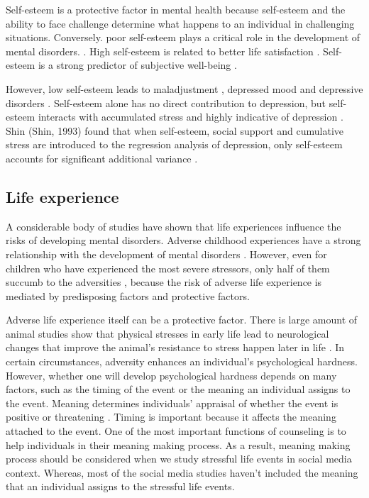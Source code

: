 Self-esteem is a protective factor in mental health because self-esteem and the ability to face challenge determine what happens to an individual in challenging situations. Conversely. poor self-esteem plays a critical role in the development of mental disorders. \cite{mann2004self}. High self-esteem is related to better life satisfaction \cite{zimmerman2000self}.  Self-esteem is a strong predictor of subjective well-being \cite{furnham2000perceived}. 

However, low self-esteem leads to maladjustment \cite{garmezy1984study}, depressed mood and depressive disorders \cite{rice1998self,dori1999depression}. Self-esteem alone has no direct contribution to depression, but self-esteem interacts with accumulated stress and highly indicative of depression \cite{miller1989self}.  Shin (Shin, 1993) found that when self-esteem, social support and cumulative stress are introduced to the regression analysis of depression, only self-esteem accounts for significant additional variance \cite{shin1993factors}. 

\subsection{Life experience}
 A considerable body of studies have shown that life experiences influence the risks of developing mental disorders. Adverse childhood experiences have a strong relationship with the development of mental disorders \cite{foege1998adverse}. However, even for children who have experienced the most severe stressors, only half of them succumb to the adversities \cite{rutter1979protective}, because the risk of adverse life experience is mediated by predisposing factors and protective factors. 

Adverse life experience itself can be a protective factor. There is large amount of animal studies show that physical stresses in early life lead to neurological changes that improve the animal's resistance to stress happen later in life \cite{hennessy1979stress}. In certain circumstances, adversity enhances an individual's psychological hardness. However, whether one will develop psychological hardness depends on many factors, such as the timing of the event or the meaning an individual assigns to the event. Meaning determines individuals' appraisal of whether the event is positive or threatening \cite{rutter1985resilience}. Timing is important because it affects the meaning attached to the event. One of the most important functions of counseling is to help individuals in their meaning making process. As a result, meaning making process should be considered when we study stressful life events in social media context. Whereas, most of the social media studies haven't included the meaning that an individual assigns to the stressful life events.

